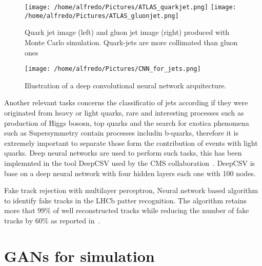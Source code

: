 \documentclass{PoS}
\begin{document}
\begin{figure}
\begin{center}
  \texttt{[image: /home/alfredo/Pictures/ATLAS\_quarkjet.png]}
  \texttt{[image: /home/alfredo/Pictures/ATLAS\_gluonjet.png]}
  \caption{Quark jet image (left) and gluon jet image (right) produced with Monte Carlo simulation. Quark-jets are more collimated than gluon ones}
  \label{fig:jet_images}
\end{center}
\end{figure}


\begin{figure}
\begin{center}
  \texttt{[image: /home/alfredo/Pictures/CNN\_for\_jets.png]}
  \caption{Illustration of a deep convolutional neural network arquitecture.}
  \label{fig:cnn_schema}
\end{center}
\end{figure}




Another relevant tasks concerns the classificatio of jets according if they were originated from heavy or light quarks, rare and interesting
processes such as production of Higgs bososn, top quarks and the search for exotica phenomena such as Supersymmetry contain processes includin
b-quarks, therefore it is extremely important to separate those form the contribution of events with light quarks. Deep neural networks are used to perform such tasks, this has been implemnted in the tool DeepCSV used by the CMS collaboration~\cite{cms}. DeepCSV is base on a deep neural network
with four hidden layers each one with 100 nodes. 


Fake track rejection with multilayer perceptron,  Neural network based algorithm to identify fake tracks in the LHCb patter recognition. The
algorithm retains more that 99\% of well reconstructed tracks while reducing the number of fake tracks by 60\% as reported in~\cite{lhcb}.


\section{GANs for simulation}
\end{document}
